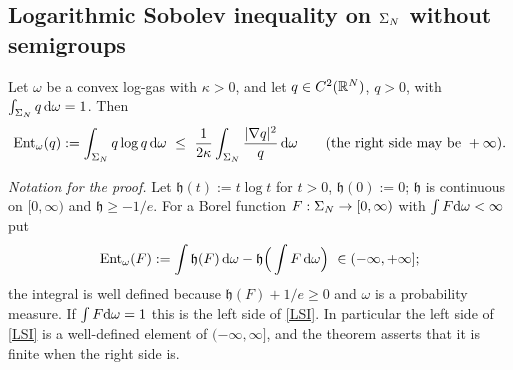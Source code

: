 \subsection{Logarithmic Sobolev inequality on $\Sigma_N$ without semigroups}

\begin{theorem}\label{thm:LSI}
Let $\omega$ be a convex log-gas with $\kappa>0$, and let $q\in C^2(\mathbb{R}^N)$, $q>0$, with $\int_{\Sigma_N}q\,\mathrm{d}\omega=1$. Then
\begin{equation}\label{LSI}
\Ent_\omega(q):=\int_{\Sig}q\log q\,\rd\omega\ \le\ \frac1{2\kappa}\int_{\Sig}\frac{|\nabla q|^2}{q}\,\rd\omega\qquad(\text{the right side may be }+\infty).
\end{equation}
\end{theorem}

\noindent\emph{Notation for the proof.} Let $\mathfrak h(t):=t\log t$ for $t>0$, $\mathfrak h(0):=0$; $\mathfrak h$ is continuous on $[0,\infty)$ and $\mathfrak h\ge-1/e$.
For a Borel function $F:\Sigma_N\to[0,\infty)$ with $\int F\mathrm{d}\omega<\infty$ put
\[\Ent_\omega(F):=\int\mathfrak h(F)\,\rd\omega-\mathfrak h\Big(\int F\,\rd\omega\Big)\ \in(-\infty,+\infty];\]
the integral is well defined because $\mathfrak h(F)+1/e\ge0$ and $\omega$ is a probability measure. If $\int F\mathrm{d}\omega=1$ this is the left side of \eqref{LSI}.
In particular the left side of \eqref{LSI} is a well-defined element of $(-\infty,\infty]$, and the theorem asserts that it is finite when the right side is.

